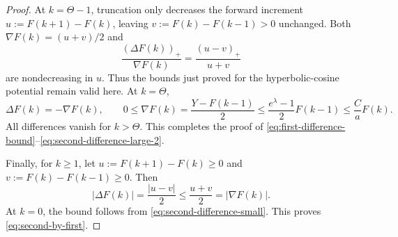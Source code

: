 \documentclass[10pt,a4paper]{amsart}
\begin{document}
\begin{proof}
At $k=\Theta-1$, truncation only decreases the forward increment
$u:=F(k+1)-F(k)$, leaving $v:=F(k)-F(k-1)>0$ unchanged.
Both $\nabla F(k)=(u+v)/2$ and
\[
 \frac{(\Delta F(k))_+}{\nabla F(k)}
 =\frac{(u-v)_+}{u+v}
\]
are nondecreasing in $u$. Thus the bounds just proved for the {\color{black}hyperbolic-cosine} potential remain valid here. At $k=\Theta$,
\[
 \Delta F(k)=-\nabla F(k),\qquad
 0\le\nabla F(k)=\frac{Y-F(k-1)}2
 \le\frac{e^\lambda-1}{2}F(k-1)\le\frac{C}{a}F(k).
\]
All differences vanish for $k>\Theta$. This completes the proof of
\eqref{eq:first-difference-bound}--\eqref{eq:second-difference-large-2}.


Finally, for $k\ge1$, let
$u:=F(k+1)-F(k)\ge0$ and $v:=F(k)-F(k-1)\ge0$.
Then
\[
 |\Delta F(k)|=\frac{|u-v|}{2}
 \le\frac{u+v}{2}=|\nabla F(k)|.
\]
At $k=0$, the bound follows from \eqref{eq:second-difference-small}.
This proves \eqref{eq:second-by-first}.
\end{proof}
\end{document}
